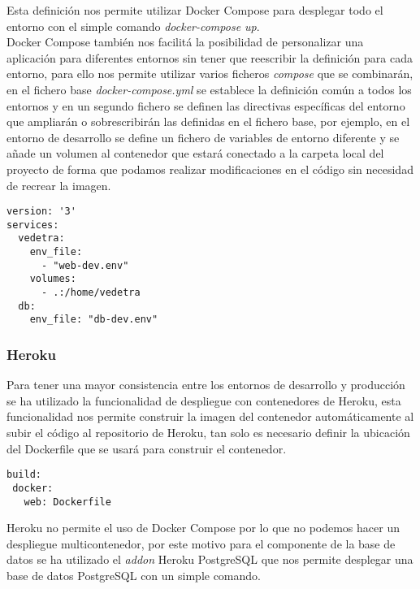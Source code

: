 \documentclass[../proyecto.tex]{subfiles}
\begin{document}
Esta definición nos permite utilizar Docker Compose para desplegar todo el entorno con el simple comando \textit{docker-compose up}.\\

Docker Compose también nos facilitá la posibilidad de personalizar una aplicación para  diferentes entornos sin tener que reescribir la definición para cada entorno, para ello nos permite utilizar varios ficheros \textit{compose} que se combinarán, en el fichero base \textit{docker-compose.yml} se establece la definición común a todos los entornos y en un segundo fichero se definen las directivas específicas del entorno que ampliarán o sobrescribirán las definidas en el fichero base, por ejemplo, en el entorno de desarrollo se define un fichero de variables de entorno diferente y se añade un volumen al contenedor que estará conectado a la carpeta local del proyecto de forma que podamos realizar modificaciones en el código sin necesidad de recrear la imagen.\\

\begin{minipage}{\linewidth}
\begin{lstlisting}[caption=Fichero docker-compose.yml para el entorno de desarrollo, captionpos=b, frame=single]
version: '3'
services:
  vedetra:
    env_file:
      - "web-dev.env"
    volumes:
      - .:/home/vedetra
  db:
    env_file: "db-dev.env"
\end{lstlisting}
\end{minipage}

\subsubsection{Heroku}

Para tener una mayor consistencia entre los entornos de desarrollo y producción se ha utilizado la funcionalidad de despliegue con contenedores de Heroku, esta funcionalidad nos permite construir la imagen del contenedor automáticamente al subir el código al repositorio de Heroku, tan solo es necesario definir la ubicación del Dockerfile que se usará para construir el contenedor.\\

\begin{minipage}{\linewidth}
\begin{lstlisting}[caption=Definición de aplicación de Heroku, captionpos=b, frame=single]
build:
 docker:
   web: Dockerfile
\end{lstlisting}
\end{minipage}

Heroku no permite el uso de Docker Compose por lo que no podemos hacer un despliegue multicontenedor, por este motivo para el componente de la base de datos se ha utilizado el \textit{addon} Heroku PostgreSQL que nos permite desplegar una base de datos PostgreSQL con un simple comando.\\
\end{document}
